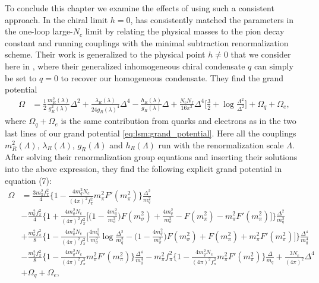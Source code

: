 To conclude this chapter we examine the effects of using such a consistent approach.
In the chiral limit $h=0$,
\cite{ref:jo_lsm_consistent_chiral} has consistently matched the parameters in the one-loop large-$N_c$ limit
by relating the physical masses to the pion decay constant and running couplings with the minimal subtraction renormalization scheme.
Their work is generalized to the physical point $h \neq 0$ that we consider here in \cite{ref:jo_lsm_consistent_physical},
where their generalized inhomogeneous chiral condensate $q$ can simply be set to $q=0$ to recover our homogeneous condensate.
They find the grand potential
\begin{equation}
\begin{split}
	\Omega &= \frac12 \frac{m_R^2(\lambda)}{g_R^2(\lambda)} \Delta^2 + \frac{\lambda_R(\lambda)}{24 g_R(\lambda)^4} \Delta^4 - \frac{h_R(\lambda)}{g_R(\lambda)} \Delta + \frac{N_c N_f}{16 \pi^2} \Delta^4 \bigg[ \frac32 + \log \frac{\Lambda^2}{\Delta^2} \bigg] + \Omega_q + \Omega_e,
\end{split}
\label{eq:lsm2f:grand_potential_consistent_before}
\end{equation}
where $\Omega_q+\Omega_e$ is the same contribution from quarks and electrons as in the two last lines of our grand potential \eqref{eq:lsm:grand_potential}.
Here all the couplings $m_R^2(\Lambda)$, $\lambda_R(\Lambda)$, $g_R(\Lambda)$ and $h_R(\Lambda)$ run with the renormalization scale $\Lambda$.
After solving their renormalization group equations and inserting their solutions into the above expression,
they find the following explicit grand potential in equation (7):
\begin{equation}
\begin{split}
	\Omega &= \frac{3 m_\pi^2 f_\pi^2}{4} \Bigg\{ 1 - \frac{4 m_q^2 N_c}{(4\pi)^2 f_\pi^2} m_\pi^2 F'(m_\pi^2) \Bigg\} \frac{\Delta^2}{m_q^2} \\
	       &- \frac{m_\sigma^2 f_\pi^2}{4} \Bigg\{ 1 + \frac{4 m_q^2 N_c}{(4\pi)^2 f_\pi^2} \Bigg[ \bigg(1 - \frac{4 m_q^2}{m_\sigma^2}\bigg) F(m_\sigma^2) + \frac{4 m_q^2}{m_\sigma^2} - F(m_\pi^2) - m_\pi^2 F'(m_\pi^2) \Bigg] \Bigg\} \frac{\Delta^2}{m_q^2} \\
	       &+ \frac{m_\sigma^2 f_\pi^2}{8} \Bigg\{ 1 - \frac{4 m_q^2 N_c}{(4 \pi)^2 f_\pi^2} \Bigg[ \frac{4 m_q^2}{m_\sigma^2} \log \frac{\Delta^2}{m_q^2} - \bigg(1 - \frac{4 m_q^2}{m_\sigma^2}\bigg) F(m_\sigma^2) + F(m_\pi^2) + m_\pi^2 F'(m_\pi^2) \Bigg] \Bigg\} \frac{\Delta^4}{m_q^4} \\
	       &- \frac{m_\pi^2 f_\pi^2}{8} \Bigg\{ 1 - \frac{4 m_q^2 N_c}{(4\pi)^2 f_\pi^2} m_\pi^2 F'(m_\pi^2) \Bigg\} \frac{\Delta^4}{m_q^4} - m_\pi^2 f_\pi^2 \Bigg\{ 1 - \frac{4 m_q^2 N_c}{(4\pi)^2 f_\pi^2} m_\pi^2 F'(m_\pi^2) \Bigg\} \frac{\Delta}{m_q} + \frac{3 N_c}{(4 \pi)^2} \Delta^4 \\
	       &+ \Omega_q + \Omega_e ,
\end{split}
\label{eq:lsm2f:grand_potential_consistent}
\end{equation}
